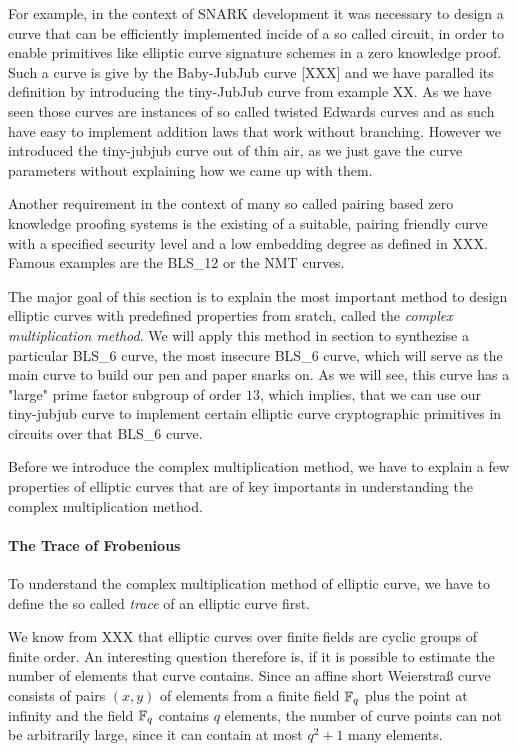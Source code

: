 For example, in the context of SNARK development it was necessary to design a curve that can be efficiently implemented incide of a so called circuit, in order to enable primitives like elliptic curve signature schemes in a zero knowledge proof. Such a curve is give by the Baby-JubJub curve [XXX] and we have paralled its definition by introducing the tiny-JubJub curve from example XX. As we have seen those curves are instances of so called twisted Edwards curves and as such have easy to implement addition laws that work without branching. However we introduced the tiny-jubjub curve out of thin air, as we just gave the curve parameters without explaining how we came up with them.

Another requirement in the context of many so called pairing based zero knowledge proofing systems is the existing of a suitable, pairing friendly curve with a specified security level and a low embedding degree as defined in XXX. Famous examples are the BLS\_12 or the NMT curves.

The major goal of this section is to explain the most important method to design elliptic curves with predefined properties from sratch, called the \textit{complex multiplication method}. We will apply this method in section to synthezise a particular BLS\_6 curve, the most insecure BLS\_6 curve, which will serve as the main curve to build our pen and paper snarks on. As we will see, this curve has a "large" prime factor subgroup of order $13$, which implies, that we can use our tiny-jubjub curve to implement certain elliptic curve cryptographic primitives in circuits over that BLS\_6 curve. 
 
Before we introduce the complex multiplication method, we have to explain a few properties of elliptic curves that are of key importants in understanding the complex multiplication method. 
\paragraph{The Trace of Frobenious} To understand the complex multiplication method of elliptic curve, we have to define the so called \textit{trace} of an elliptic curve first.

We know from XXX that elliptic curves over finite fields are cyclic groups of finite order. An interesting question therefore is, if it is possible to estimate the number of elements that curve contains. Since an affine short Weierstraß curve consists of pairs $(x,y)$ of elements from a finite field $\mathbb{F}_q$ plus the point at infinity and the field $\mathbb{F}_q$ contains $q$ elements, the number of curve points can not be arbitrarily large, since it can contain at most $q^2+1$ many elements. 

